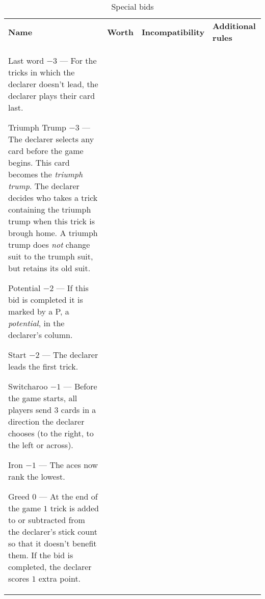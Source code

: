 %
%
%

\newcommand{\nonTrump}{\textnormal{non-trump bids}}

\begin{table}
	\caption{Special bids}\label{tab:specialBids}
	\begin{center}
		\begin{tabularx}{\textwidth}{lcp{3cm}|X}
			\textbf{Name} &
			\textbf{Worth} &
			\textbf{Incompatibility} &
			\textbf{Additional rules}
			\\[-3ex]

			\specialBidItem%
			{Last word}
			{$-3$}
			{---}
			{%
				For the tricks in which the declarer doesn't lead, the declarer plays their card last.
			}

			\specialBidItem%
			{Triumph Trump}
			{$-3$}
			{---}
			{%
				The declarer selects any card before the game begins. This card becomes the \emph{triumph trump}. The declarer decides who takes a trick containing the triumph trump when this trick is brough home. A triumph trump does \emph{not} change suit to the trumph suit, but retains its old suit.
			}

			\specialBidItem%
			{Potential}
			{$-2$}
			{---}
			{%
				If this bid is completed it is marked by a P, a \emph{potential}, in the declarer's column.
			}

			\specialBidItem%
			{Start}
			{$-2$}
			{---}
			{%
				The declarer leads the first trick.
			}

			\specialBidItem%
			{Switcharoo}
			{$-1$}
			{---}
			{%
				Before the game starts, all players send $3$ cards in a direction the declarer chooses (to the right, to the left or across).
			}

			\specialBidItem%
			{Iron}
			{$-1$}
			{---}
			{%
				The aces now rank the lowest.
			}

			\specialBidItem%
			{Greed}
			{$0$}
			{---}
			{%
				At the end of the game $1$ trick is added to or subtracted from the declarer's stick count so that it doesn't benefit them. If the bid is completed, the declarer scores $1$ extra point.
			}


\end{tabularx}
\end{center}
\end{table}
